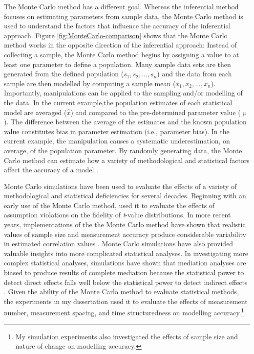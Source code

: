 \documentclass[
12pt, %
twoside,
english]{guelphthesis}
\begin{document}
The Monte Carlo method has a different goal. Whereas the inferential method focuses on estimating parameters from sample data, the Monte Carlo method is used to understand the factors that influence the accuracy of the inferential approach. Figure \ref{fig:MonteCarlo-comparison} shows that the Monte Carlo method works in the opposite direction of the inferential approach: Instead of collecting a sample, the Monte Carlo method begins by assigning a value to at least one parameter to define a population. Many sample data sets are then generated from the defined population (\(s_1, s_2, ..., s_n\)) and the data from each sample are then modelled by computing a sample mean (\(\bar{x}_1, \bar{x}_2, ..., \bar{x}_n\)). Importantly, manipulations can be applied to the sampling and/or modelling of the data. In the current example,the population estimates of each statistical model are averaged (\(\bar{\bar{x}}\)) and compared to the pre-determined parameter value (\(\upmu\)). The difference between the average of the estimates and the known population value constitutes bias in parameter estimation (i.e., parameter bias). In the current example, the manipulation causes a systematic underestimation, on average, of the population parameter. By randomly generating data, the Monte Carlo method can estimate how a variety of methodological and statistical factors affect the accuracy of a model \autocite[for a review, see][]{robert2010}.

Monte Carlo simulations have been used to evaluate the effects of a variety of methodological and statistical deficiencies for several decades. Beginning with an early use of the Monte Carlo method, \textcite{boneau1960} used it to evaluate the effects of assumption violations on the fidelity of \emph{t}-value distributions. In more recent years, implementations of the the Monte Carlo method have shown that realistic values of sample size
and measurement accuracy produce considerable variability in estimated correlation values \autocite{stanley2014}. Monte Carlo simulations have also provided valuable insights into more complicated statistical analyses. In investigating more complex statistical analyses, simulations have shown that mediation analyses are biased to produce results of complete mediation because the statistical power to detect direct effects falls well below the statistical power to detect indirect effects \autocite{kenny2014}. Given the ability of the Monte Carlo method to evaluate statistical methods, the experiments in my dissertation used it to evaluate the effects of measurement number, measurement spacing, and time structuredness on modelling accuracy.\footnote{My simulation experiments also investigated the effects of sample size and nature of change on modelling accuracy.}
\end{document}
